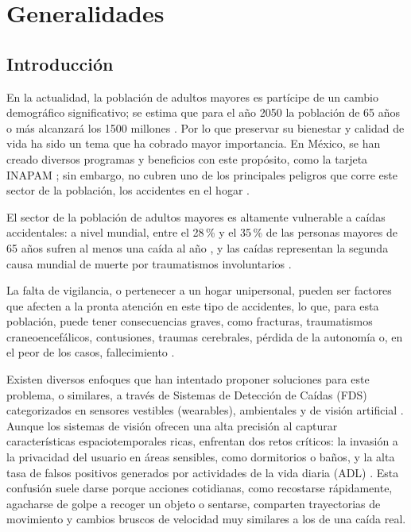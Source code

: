 \documentclass[12pt,a4paper,oneside]{book}
\theoremstyle{plain}
\theoremstyle{definition}
\theoremstyle{remark}
\begin{document}
\chapter{Generalidades}
\label{cap:generalidades}

\section{Introducción}
En la actualidad, la población de adultos mayores es partícipe de un cambio demográfico significativo; se estima que para el año 2050 la población de 65 años o más alcanzará los 1500 millones \parencite{un2019ageing}. Por lo que preservar su bienestar y calidad de vida ha sido un tema que ha cobrado mayor importancia. En México, se han creado diversos programas y beneficios con este propósito, como la tarjeta INAPAM \parencite{inapam2025tarjeta}; sin embargo, no cubren uno de los principales peligros que corre este sector de la población, los accidentes en el hogar \parencite{inapam2015alerta}.

El sector de la población de adultos mayores es altamente vulnerable a caídas accidentales: a nivel mundial, entre el 28\,\% y el 35\,\% de las personas mayores de 65 años sufren al menos una caída al año \parencite{who2008falls}, y las caídas representan la segunda causa mundial de muerte por traumatismos involuntarios \parencite{who2021caidas}.

La falta de vigilancia, o pertenecer a un hogar unipersonal, pueden ser factores que afecten a la pronta atención en este tipo de accidentes, lo que, para esta población, puede tener consecuencias graves, como fracturas, traumatismos craneoencefálicos, contusiones, traumas cerebrales, pérdida de la autonomía o, en el peor de los casos, fallecimiento \parencite{cenidsp2023caidas}.

Existen diversos enfoques que han intentado proponer soluciones para este problema, o similares, a través de Sistemas de Detección de Caídas (FDS) categorizados en sensores vestibles (wearables), ambientales y de visión artificial \parencite{nahian2026ai}. Aunque los sistemas de visión ofrecen una alta precisión al capturar características espaciotemporales ricas, enfrentan dos retos críticos: la invasión a la privacidad del usuario en áreas sensibles, como dormitorios o baños, y la alta tasa de falsos positivos generados por actividades de la vida diaria (ADL) \parencite{nahian2026ai}. Esta confusión suele darse porque acciones cotidianas, como recostarse rápidamente, agacharse de golpe a recoger un objeto o sentarse, comparten trayectorias de movimiento y cambios bruscos de velocidad muy similares a los de una caída real.
\end{document}
